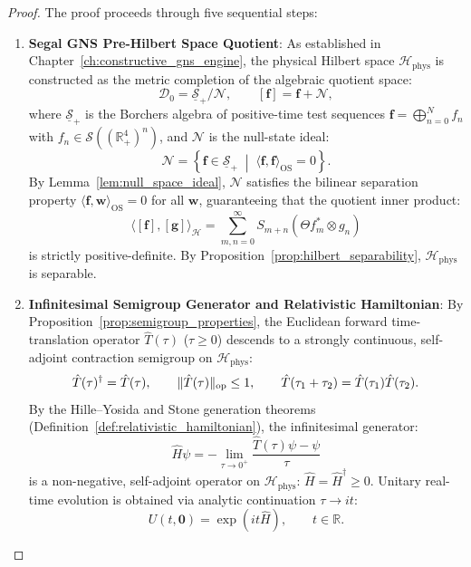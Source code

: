 \begin{proof}
The proof proceeds through five sequential steps:
\begin{enumerate}[label=\textbf{Step \arabic*:}, leftmargin=*]
    \item \textbf{Segal GNS Pre-Hilbert Space Quotient}:
    As established in Chapter~\ref{ch:constructive_gns_engine}, the physical Hilbert space $\mathcal{H}_{\mathrm{phys}}$ is constructed as the metric completion of the algebraic quotient space:
    \begin{equation}
    \mathcal{D}_0 = \underline{\mathcal{S}}_+ / \mathcal{N}, \qquad [\mathbf{f}] = \mathbf{f} + \mathcal{N},
    \end{equation}
    where $\underline{\mathcal{S}}_+$ is the Borchers algebra of positive-time test sequences $\mathbf{f} = \bigoplus_{n=0}^N f_n$ with $f_n \in \mathcal{S}((\mathbb{R}_+^4)^n)$, and $\mathcal{N}$ is the null-state ideal:
    \begin{equation}
    \mathcal{N} = \left\{ \mathbf{f} \in \underline{\mathcal{S}}_+ \;\middle|\; \langle \mathbf{f}, \mathbf{f} \rangle_{\mathrm{OS}} = 0 \right\}.
    \end{equation}
    By Lemma~\ref{lem:null_space_ideal}, $\mathcal{N}$ satisfies the bilinear separation property $\langle \mathbf{f}, \mathbf{w} \rangle_{\mathrm{OS}} = 0$ for all $\mathbf{w}$, guaranteeing that the quotient inner product:
    \begin{equation}
    \langle [\mathbf{f}], [\mathbf{g}] \rangle_{\mathcal{H}} = \sum_{m, n = 0}^\infty S_{m+n}(\Theta f_m^* \otimes g_n)
    \end{equation}
    is strictly positive-definite. By Proposition~\ref{prop:hilbert_separability}, $\mathcal{H}_{\mathrm{phys}}$ is separable.

    \item \textbf{Infinitesimal Semigroup Generator and Relativistic Hamiltonian}:
    By Proposition~\ref{prop:semigroup_properties}, the Euclidean forward time-translation operator $\hat{T}(\tau)$ ($\tau \ge 0$) descends to a strongly continuous, self-adjoint contraction semigroup on $\mathcal{H}_{\mathrm{phys}}$:
    \begin{equation}
    \hat{T}(\tau)^\dagger = \hat{T}(\tau), \qquad \|\hat{T}(\tau)\|_{\mathrm{op}} \le 1, \qquad \hat{T}(\tau_1 + \tau_2) = \hat{T}(\tau_1) \hat{T}(\tau_2).
    \end{equation}
    By the Hille--Yosida and Stone generation theorems (Definition~\ref{def:relativistic_hamiltonian}), the infinitesimal generator:
    \begin{equation}
    \hat{H} \psi = -\lim_{\tau \to 0^+} \frac{\hat{T}(\tau) \psi - \psi}{\tau}
    \end{equation}
    is a non-negative, self-adjoint operator on $\mathcal{H}_{\mathrm{phys}}$: $\hat{H} = \hat{H}^\dagger \ge 0$.
    Unitary real-time evolution is obtained via analytic continuation $\tau \to i t$:
    \begin{equation}
    U(t, \mathbf{0}) = \exp(i t \hat{H}), \qquad t \in \mathbb{R}.
    \end{equation}


\end{enumerate}
\end{proof}
